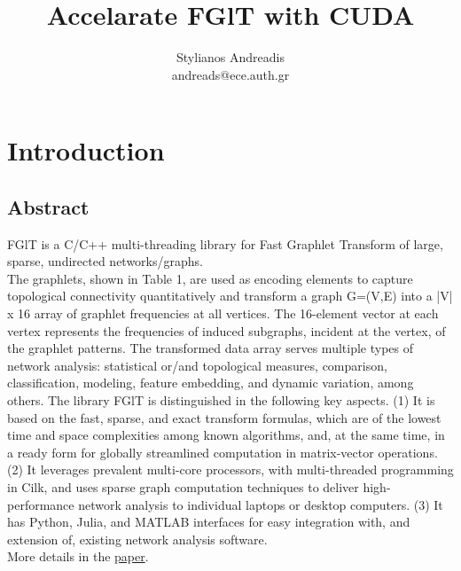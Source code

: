 \documentclass{report}
\author{Stylianos Andreadis\\andreads@ece.auth.gr}
\title{Accelarate FGlT with CUDA}
\begin{document}
\maketitle
\tableofcontents

\chapter{Introduction}
\section{Abstract}
FGlT is a C/C++ multi-threading library for Fast Graphlet Transform of large, sparse, undirected networks/graphs.\\
The graphlets, shown in Table 1, are used as encoding elements to capture topological connectivity quantitatively and transform a graph G=(V,E) into a |V| x 16 array of graphlet frequencies at all vertices. The 16-element vector at each vertex represents the frequencies of induced subgraphs, incident at the vertex, of the graphlet patterns. The transformed data array serves multiple types of network analysis: statistical or/and topological measures, comparison, classification, modeling, feature embedding, and dynamic variation, among others. The library FGlT is distinguished in the following key aspects. (1) It is based on the fast, sparse, and exact transform formulas, which are of the lowest time and space complexities among known algorithms, and, at the same time, in a ready form for globally streamlined computation in matrix-vector operations. (2) It leverages prevalent multi-core processors, with multi-threaded programming in Cilk, and uses sparse graph computation techniques to deliver high-performance network analysis to individual laptops or desktop computers. (3) It has Python, Julia, and MATLAB interfaces for easy integration with, and extension of, existing network analysis software.\\
More details in the \href{https://arxiv.org/abs/2007.11111}{paper}.
\end{document}
